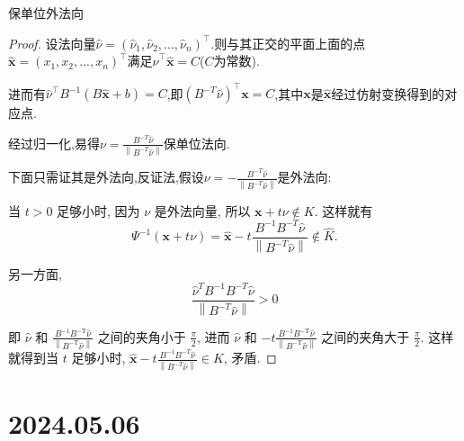 \documentclass[12pt,a4paper]{article}
\begin{document}
\begin{enumerate}
		保单位外法向
		
		\begin{proof}
			设法向量$\widehat{\nu}=(\widehat{\nu}_1,\widehat{\nu}_2,...,\widehat{\nu}_n)^\top$.则与其正交的平面上面的点$\widehat{\boldsymbol{x}}=(x_1,x_2,...,x_n)^\top$满足$\widehat{\nu}^\top \widehat{\boldsymbol{x}}=C$($C$为常数).
			
			进而有$\widehat{\nu}^\top B^{-1} (B\widehat{\boldsymbol{x}}+b)=C$,即$(B^{-T} \widehat{\nu})^\top \boldsymbol{x}=C$,其中$\boldsymbol{x}$是$\widehat{\boldsymbol{x}}$经过仿射变换得到的对应点.
			
			经过归一化,易得$
			\nu=\frac{B^{-T} \widehat{\nu}}{\left\|B^{-T} \widehat{\nu}\right\|}
			$保单位法向.
			
			下面只需证其是外法向,反证法,假设$
			\nu=-\frac{B^{-T} \widehat{\nu}}{\left\|B^{-T} \widehat{\nu}\right\|}
			$是外法向:
			
			当 $t>0$ 足够小时, 因为 $\nu$ 是外法向量, 所以 $\boldsymbol{x}+t \nu \notin K$. 这样就有
			$$
			\Psi^{-1}(\boldsymbol{x}+t \nu)=\widehat{\boldsymbol{x}}-t \frac{B^{-1} B^{-{T}} \widehat{\nu}}{\left\|B^{-{T}} \widehat{\nu}\right\|} \notin \hat{K} .
			$$
			
			另一方面,
			$$
			\frac{\hat{\nu}^{{T}} {B}^{-1} {B}^{-{T}} \widehat{{\nu}}}{\left\|{B}^{-{T}} \widehat{{\nu}}\right\|}>0
			$$
			
			即 $\hat{\nu}$ 和 $\frac{B^{-1} B^{-\mathrm{T}} \hat{\nu}}{\left\|B^{-\mathrm{T}} \hat{\nu}\right\|}$ 之间的夹角小于 $\frac{\pi}{2}$, 进而 $\hat{\nu}$ 和 $-t \frac{B^{-1} B^{-\mathrm{T}} \hat{\nu}}{\left\|B^{-\mathrm{T}} \hat{\nu}\right\|}$ 之间的夹角大于 $\frac{\pi}{2}$. 这样就得到当 $t$ 足够小时, $\hat{\boldsymbol{x}}-t \frac{{B}^{-1} {B}^{-{T}} \hat{{\nu}}}{\left\|{B}^{-{T}} \hat{{\nu}}\right\|} \in K$, 矛盾.
		\end{proof}
	\end{enumerate}
	
	\newpage
	
	\section*{2024.05.06}	
	
\end{document}
